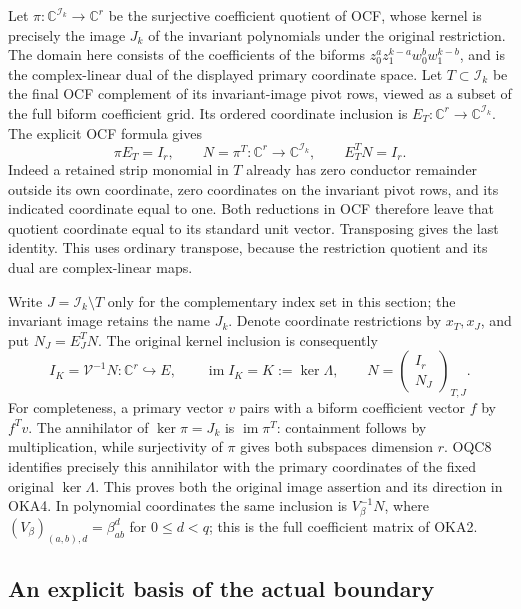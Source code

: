 \documentclass[11pt,a4paper]{article}
\begin{document}
Let $\pi:\mathbb C^{\mathcal I_k}\to\mathbb C^r$ be the
surjective coefficient quotient of OCF, whose kernel is precisely
the image $J_k$ of the invariant polynomials under the original
restriction. The domain here consists of the coefficients of the
biforms
$z_0^a z_1^{k-a}w_0^b w_1^{k-b}$, and is the complex-linear
dual of the displayed primary coordinate space. Let
$T\subset\mathcal I_k$ be the final OCF complement of its
invariant-image pivot rows, viewed as a subset of the full
biform coefficient grid. Its ordered coordinate inclusion is
$E_T:\mathbb C^r\to\mathbb C^{\mathcal I_k}$. The explicit
OCF formula gives
\[
 \pi E_T=I_r,\qquad
 N=\pi^T:\mathbb C^r\longrightarrow\mathbb C^{\mathcal I_k},
 \qquad E_T^TN=I_r.
 \tag{OKA3}
\]
Indeed a retained strip monomial in $T$ already has zero
conductor remainder outside its own coordinate, zero coordinates
on the invariant pivot rows, and its indicated coordinate equal
to one. Both reductions in OCF therefore leave that quotient
coordinate equal to its standard unit vector. Transposing gives
the last identity. This uses ordinary transpose, because the
restriction quotient and its dual are complex-linear maps.

Write $J=\mathcal I_k\setminus T$ only for the complementary
index set in this section; the invariant image retains the name
$J_k$. Denote coordinate restrictions by $x_T,x_J$, and put
$N_J=E_J^TN$. The original kernel inclusion is consequently
\[
 I_K=\mathcal V^{-1}N:\mathbb C^r\hookrightarrow E,
 \qquad
 \operatorname{im}I_K=K:=\ker\Lambda,\qquad
 N=\begin{pmatrix}I_r\\N_J\end{pmatrix}_{T,J}.
 \tag{OKA4}
\]
For completeness, a primary vector $v$ pairs with a biform
coefficient vector $f$ by $f^Tv$. The annihilator of
$\ker\pi=J_k$ is $\operatorname{im}\pi^T$: containment
follows by multiplication, while surjectivity of $\pi$ gives
both subspaces dimension $r$. OQC8 identifies precisely this
annihilator with the primary coordinates of the fixed original
$\ker\Lambda$. This proves both the original image assertion
and its direction in OKA4. In polynomial coordinates the same
inclusion is $V_\beta^{-1}N$, where
$(V_\beta)_{(a,b),d}=\beta_{ab}^d$ for $0\leq d<q$;
this is the full coefficient matrix of OKA2.

\subsection{An explicit basis of the actual boundary}
\end{document}
